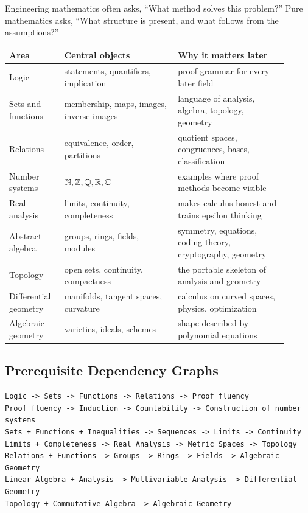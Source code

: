 \documentclass[11pt]{article}
\begin{document}
Engineering mathematics often asks, ``What method solves this problem?'' Pure mathematics asks, ``What structure is present, and what follows from the assumptions?''

\begin{longtable}{p{0.18\linewidth}p{0.37\linewidth}p{0.36\linewidth}}
\toprule
Area & Central objects & Why it matters later \\
\midrule
Logic & statements, quantifiers, implication & proof grammar for every later field \\
Sets and functions & membership, maps, images, inverse images & language of analysis, algebra, topology, geometry \\
Relations & equivalence, order, partitions & quotient spaces, congruences, bases, classification \\
Number systems & $\mathbb{N},\mathbb{Z},\mathbb{Q},\mathbb{R},\mathbb{C}$ & examples where proof methods become visible \\
Real analysis & limits, continuity, completeness & makes calculus honest and trains epsilon thinking \\
Abstract algebra & groups, rings, fields, modules & symmetry, equations, coding theory, cryptography, geometry \\
Topology & open sets, continuity, compactness & the portable skeleton of analysis and geometry \\
Differential geometry & manifolds, tangent spaces, curvature & calculus on curved spaces, physics, optimization \\
Algebraic geometry & varieties, ideals, schemes & shape described by polynomial equations \\
\bottomrule
\end{longtable}

\subsection{Prerequisite Dependency Graphs}

\begin{verbatim}
Logic -> Sets -> Functions -> Relations -> Proof fluency
Proof fluency -> Induction -> Countability -> Construction of number systems
Sets + Functions + Inequalities -> Sequences -> Limits -> Continuity
Limits + Completeness -> Real Analysis -> Metric Spaces -> Topology
Relations + Functions -> Groups -> Rings -> Fields -> Algebraic Geometry
Linear Algebra + Analysis -> Multivariable Analysis -> Differential Geometry
Topology + Commutative Algebra -> Algebraic Geometry
\end{verbatim}
\end{document}
